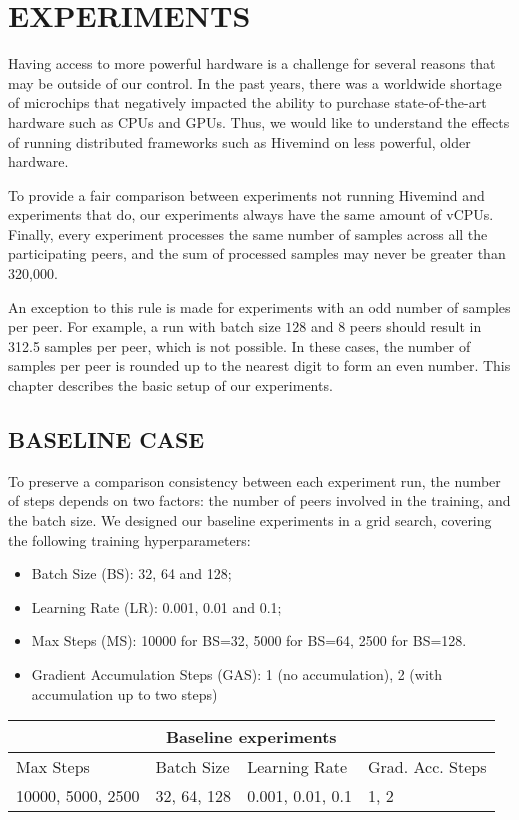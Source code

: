 \chapter{EXPERIMENTS}\label{chapter:experiments}

Having access to more powerful hardware is a challenge for several reasons that may be outside of our control.
In the past years, there was a worldwide shortage of microchips that negatively impacted the ability to purchase state-of-the-art hardware such as CPUs and GPUs.
Thus, we would like to understand the effects of running distributed frameworks such as Hivemind on less powerful, older hardware.

To provide a fair comparison between experiments not running Hivemind and experiments that do, our experiments always have the same amount of vCPUs.
Finally, every experiment processes the same number of samples across all the participating peers, and the sum of processed samples may never be greater than 320,000.

An exception to this rule is made for experiments with an odd number of samples per peer.
For example, a run with batch size $128$ and 8 peers should result in 312.5 samples per peer, which is not possible.
In these cases, the number of samples per peer is rounded up to the nearest digit to form an even number.
This chapter describes the basic setup of our experiments.

\section{BASELINE CASE}

To preserve a comparison consistency between each experiment run, the number of steps depends on two factors: the number of peers involved in the training, and the batch size.
We designed our baseline experiments in a grid search, covering the following training hyperparameters:
\begin{itemize}
    \item Batch Size (BS): 32, 64 and 128;
    \item Learning Rate (LR): 0.001, 0.01 and 0.1;
    \item Max Steps (MS): 10000 for BS=32, 5000 for BS=64, 2500 for BS=128.
    \item Gradient Accumulation Steps (GAS): 1 (no accumulation), 2 (with accumulation up to two steps)
\end{itemize}

\begin{tabularx}{\linewidth}{ |p{3cm}|p{3cm}|p{3cm}|p{3cm}|  }
    \caption{
        List of baseline experiments and hyperparameters
    }\label{table:baseline-experiments}                       \\
    \hline
    \multicolumn{4}{|c|}{Baseline experiments}                \\
    \hline
    Max Steps & Batch Size & Learning Rate & Grad. Acc. Steps \\
    \hline
    10000, 5000, 2500    & 32, 64, 128         & 0.001, 0.01, 0.1         & 1, 2                \\
    \hline
\end{tabularx}

